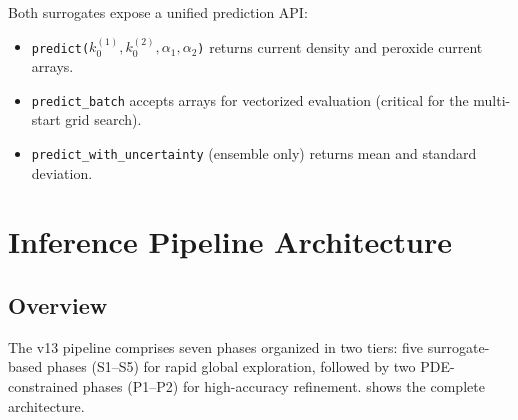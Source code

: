 \documentclass[11pt,a4paper]{article}
\newcommand{\kzero}{k_0}
\begin{document}
Both surrogates expose a unified prediction API:
\begin{itemize}
  \item \texttt{predict($\kzero^{(1)}, \kzero^{(2)}, \alpha_1, \alpha_2$)}
    returns current density and peroxide current arrays.
  \item \texttt{predict\_batch} accepts arrays for vectorized evaluation
    (critical for the multi-start grid search).
  \item \texttt{predict\_with\_uncertainty} (ensemble only) returns mean
    and standard deviation.
\end{itemize}


\section{Inference Pipeline Architecture}\label{sec:pipeline}

\subsection{Overview}\label{sec:overview}

The v13 pipeline comprises seven phases organized in two tiers:
five surrogate-based phases (S1--S5) for rapid global exploration,
followed by two PDE-constrained phases (P1--P2) for high-accuracy
refinement.  shows the complete architecture.
\end{document}

